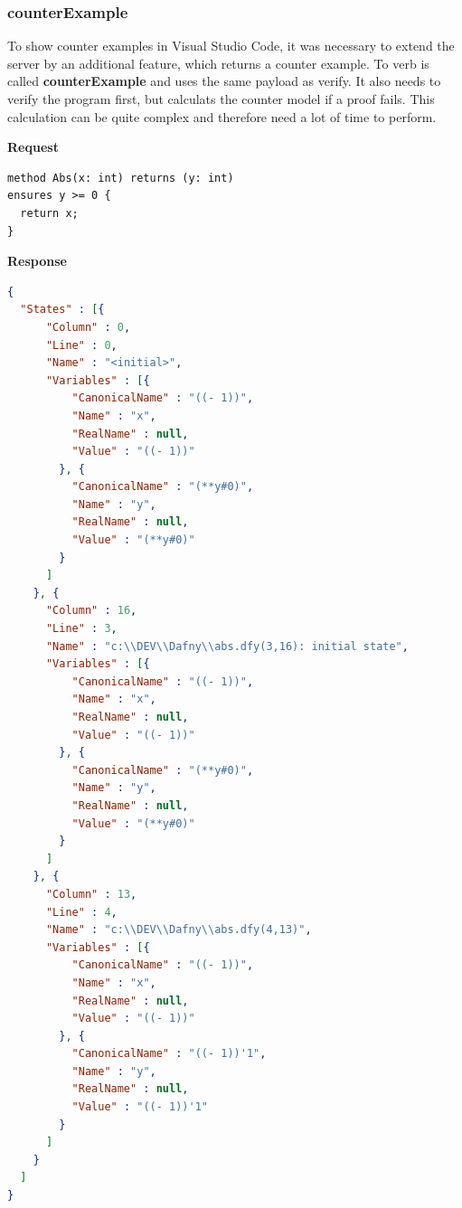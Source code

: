 \subsubsection{counterExample}
To show counter examples in Visual Studio Code, it was necessary to extend the server by an additional feature, which returns a counter example. To verb is called \textbf{counterExample} and uses the same payload as verify. It also needs to verify the program first, but calculats the counter model if a proof fails. This calculation can be quite complex and therefore need a lot of time to perform.  

\textbf{Request}
\begin{lstlisting}[language=dafny]
method Abs(x: int) returns (y: int)
ensures y >= 0 {
  return x;
}

\end{lstlisting}

\textbf{Response}
\begin{lstlisting}[language=json,firstnumber=1]
{
  "States" : [{
      "Column" : 0,
      "Line" : 0,
      "Name" : "<initial>",
      "Variables" : [{
          "CanonicalName" : "((- 1))",
          "Name" : "x",
          "RealName" : null,
          "Value" : "((- 1))"
        }, {
          "CanonicalName" : "(**y#0)",
          "Name" : "y",
          "RealName" : null,
          "Value" : "(**y#0)"
        }
      ]
    }, {
      "Column" : 16,
      "Line" : 3,
      "Name" : "c:\\DEV\\Dafny\\abs.dfy(3,16): initial state",
      "Variables" : [{
          "CanonicalName" : "((- 1))",
          "Name" : "x",
          "RealName" : null,
          "Value" : "((- 1))"
        }, {
          "CanonicalName" : "(**y#0)",
          "Name" : "y",
          "RealName" : null,
          "Value" : "(**y#0)"
        }
      ]
    }, {
      "Column" : 13,
      "Line" : 4,
      "Name" : "c:\\DEV\\Dafny\\abs.dfy(4,13)",
      "Variables" : [{
          "CanonicalName" : "((- 1))",
          "Name" : "x",
          "RealName" : null,
          "Value" : "((- 1))"
        }, {
          "CanonicalName" : "((- 1))'1",
          "Name" : "y",
          "RealName" : null,
          "Value" : "((- 1))'1"
        }
      ]
    }
  ]
}

\end{lstlisting}




